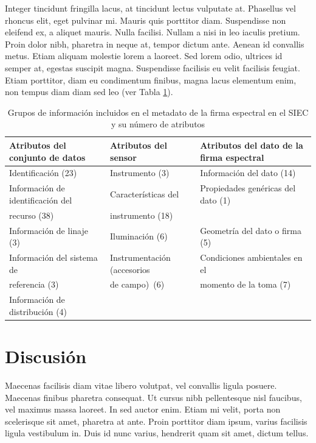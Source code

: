 \documentclass[artMGITG,SIG,accept,moreauthors,font4]{mgitg}
\begin{document}
Integer tincidunt fringilla lacus, at tincidunt lectus vulputate at. Phasellus vel rhoncus elit, eget pulvinar mi. Mauris quis porttitor diam. Suspendisse non eleifend ex, a aliquet mauris. Nulla facilisi. Nullam a nisi in leo iaculis pretium. Proin dolor nibh, pharetra in neque at, tempor dictum ante. Aenean id convallis metus. Etiam aliquam molestie lorem a laoreet. Sed lorem odio, ultrices id semper at, egestas suscipit magna. Suspendisse facilisis eu velit facilisis feugiat. Etiam porttitor, diam eu condimentum finibus, magna lacus elementum enim, non tempus diam diam sed leo (ver Tabla \ref{tab1}). 

\begin{table}[!ht]
    
    \centering
        \caption{Grupos de información incluidos en el metadato de la firma espectral en el SIEC y su número de atributos}
    \begin{tabular}{lll}
    \toprule
    Atributos del conjunto de datos & Atributos del sensor & Atributos del dato de la firma espectral\\
    \midrule
    Identificación (23)  & Instrumento (3) & Información del dato (14)\\[10pt]
    Información de identificación del & Características del & Propiedades genéricas del dato (1)\\
    recurso (38) & instrumento (18) & \\[10pt]
    Información de linaje (3)	& Iluminación (6) & Geometría del dato o firma (5)\\[10pt]
    Información del sistema de & Instrumentación (accesorios  & Condiciones ambientales en el\\
    referencia (3)  & de campo)~(6) &  momento de la toma (7)\\[10pt]
    Información de distribución (4)	& & \\
    \bottomrule
    \end{tabular}
    \label{tab1}
\end{table}




\section{Discusión}
%
\noindent
Maecenas facilisis diam vitae libero volutpat, vel convallis ligula posuere. Maecenas finibus pharetra consequat. Ut cursus nibh pellentesque nisl faucibus, vel maximus massa laoreet. In sed auctor enim. Etiam mi velit, porta non scelerisque sit amet, pharetra at ante. Proin porttitor diam ipsum, varius facilisis ligula vestibulum in. Duis id nunc varius, hendrerit quam sit amet, dictum tellus.
\end{document}
